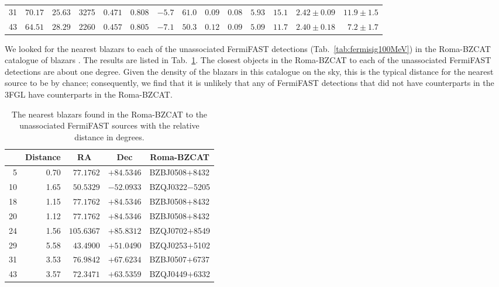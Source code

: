 \documentclass[useAMS,usenatbib]{mn2e}
\begin{document}
\begin{table}
\begin{tabular}{rrrrrrrrrrrrrr}
31 & $ 70.17$ & $ 25.63$ &   3275 & $0.471$ & $0.808$ & $  -5.7$ & $  61.0$ & $0.09$  & $0.08$ & $     5.93$ & $15.1$ & $2.42\pm0.09$ & $11.9\pm1.5$ \\
43 & $ 64.51$ & $ 28.29$ &   2260 & $0.457$ & $0.805$ & $  -7.1$ & $  50.3$ & $0.12$  & $0.09$ & $     5.09$ & $11.7$  & $2.40\pm0.18$ & $7.2\pm1.7$\\ 
\end{tabular}
\end{table}

We looked for the nearest blazars to each of the unassociated
FermiFAST detections (Tab.~\ref{tab:fermisig100MeV}) in the Roma-BZCAT
catalogue of blazars \citep{2009A&A...495..691M}.  The results are
listed in Tab.~\ref{tab:roma}.  The closest objects in the Roma-BZCAT
to each of the unassociated FermiFAST detections are about one degree.
Given the density of the blazars in this catalogue on the sky, this is
the typical distance for the nearest source to be by chance;
consequently, we find that it is unlikely that any of FermiFAST
detections that did not have counterparts in the 3FGL have
counterparts in the Roma-BZCAT.

\begin{table}
  \caption{The nearest blazars found in the Roma-BZCAT \citep{2009A&A...495..691M} to
    the unassociated FermiFAST sources with the relative distance in degrees.}
  \label{tab:roma}
\centering
\begin{tabular}{rrrrl}
    \hline
    \multicolumn{1}{c}{} &     \multicolumn{1}{c}{Distance} & \multicolumn{1}{c}{RA} & \multicolumn{1}{c}{Dec} & \multicolumn{1}{c}{Roma-BZCAT} \\
        \hline
 5   & 0.70 & $77.1762$ & $+84.5346$    & BZBJ0508$+$8432 \\
10   & 1.65 & $50.5329$ & $-52.0933$    & BZQJ0322$-$5205 \\
18   & 1.15 & $77.1762$ & $+84.5346$    & BZBJ0508$+$8432 \\
20   & 1.12 & $77.1762$ &  $+84.5346$   & BZBJ0508$+$8432 \\
24   & 1.56 & $105.6367$ & $+85.8312$   & BZQJ0702$+$8549 \\
29   & 5.58 & $43.4900$  & $+51.0490$   & BZQJ0253$+$5102 \\
31   & 3.53 & $76.9842$  & $+67.6234$   & BZBJ0507$+$6737 \\
43   & 3.57 & $72.3471$  & $+63.5359$   & BZQJ0449$+$6332 \\
\end{tabular}
\end{table}
\end{document}
